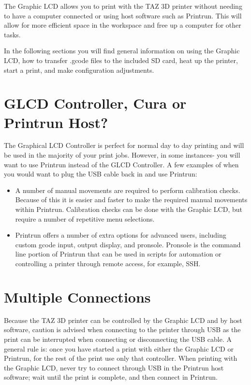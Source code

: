 %
%
%
%
%

The Graphic LCD allows you to print with the TAZ 3D printer without needing to have a computer connected or using host software such as Printrun. This will allow for more efficient space in the workspace and free up a computer for other tasks.

In the following sections you will find general information on using the Graphic LCD, how to transfer .gcode files to the included SD card, heat up the printer, start a print, and make configuration adjustments.

\section{GLCD Controller, Cura or Printrun Host?}
\label{sec:Graphic LCD, Cura or Printrun Host?}
The Graphical LCD Controller is perfect for normal day to day printing and will be used in the majority of your print jobs. However, in some instances- you will want to use Printrun instead of the GLCD Controller. A few examples of when you would want to plug the USB cable back in and use Printrun:
\begin{itemize}
	\item A number of manual movements are required to perform calibration checks. Because of this it is easier and faster to make the required manual movements within Printrun. Calibration checks can be done with the Graphic LCD, but require a number of repetitive menu selections.
	\item Printrun offers a number of extra options for advanced users, including custom gcode input, output display, and pronsole. Pronsole is the command line portion of Printrun that can be used in scripts for automation or controlling a printer through remote access, for example, SSH.
\end{itemize}

\section{Multiple Connections}
Because the TAZ 3D printer can be controlled by the Graphic LCD and by host software, caution is advised when connecting to the printer through USB as the print can be interrupted when connecting or disconnecting the USB cable. A general rule is: once you have started a print with either the Graphic LCD or Printrun, for the rest of the print use only that controller. When printing with the Graphic LCD, never try to connect through USB in the Printrun host software; wait until the print is complete, and then connect in Printrun.


